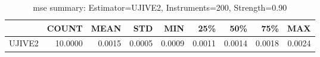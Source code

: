 \begin{table}[ht]
\centering
\caption{mse summary: Estimator=UJIVE2, Instruments=200, Strength=0.90}
\begin{tabular}{lrrrrrrrr}
\toprule
 & COUNT & MEAN & STD & MIN & 25\% & 50\% & 75\% & MAX \\
\midrule
UJIVE2 & 10.0000 & 0.0015 & 0.0005 & 0.0009 & 0.0011 & 0.0014 & 0.0018 & 0.0024 \\
\bottomrule
\end{tabular}
\end{table}

